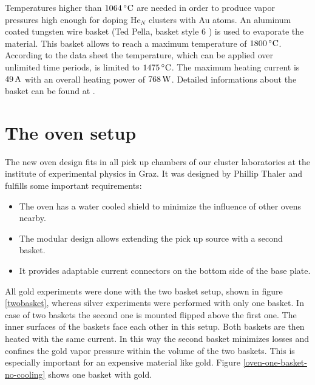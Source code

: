 \documentclass[parskip,12pt,headsepline,a4paper] {scrbook}
\begin{document}
Temperatures higher than $\unit[1064]{^\circ C}$ are needed in order to produce vapor pressures high enough for doping He$_N$ clusters with Au atoms. An aluminum coated tungsten wire basket (Ted Pella, basket style 6 \cite{albasket}) is used to evaporate the material. This basket allows to reach a maximum temperature of $\unit[1800]{^\circ C}$. According to the data sheet the temperature, which can be applied over unlimited time periods, is limited to $\unit[1475]{^\circ C}$. The maximum heating current is $\unit[49]{A}$ with an overall heating power of $\unit[768]{W}$. Detailed informations about the basket can be found at \cite{albasket}. \\

\section{The oven setup}
\vspace{-0.5\baselineskip}
The new oven design fits in all pick up chambers of our cluster laboratories at the institute of experimental physics in Graz. It was designed by Phillip Thaler and fulfills some important requirements:
\begin{itemize}
\item The oven has a water cooled shield to minimize the influence of other ovens nearby.
\item The modular design allows extending the pick up source with a second basket.
\item It provides adaptable current connectors on the bottom side of the base plate.
\end{itemize}

All gold experiments were done with the two basket setup, shown in figure \ref{twobasket}, whereas silver experiments were performed with only one basket. In case of two baskets the second one is mounted flipped above the first one. The inner surfaces of the baskets face each other in this setup. Both baskets are then heated with the same current. In this way the second basket minimizes losses and confines the gold vapor pressure within the volume of the two baskets. This is especially important for an expensive material like gold. Figure \ref{oven-one-basket-no-cooling} shows one basket with gold.
\end{document}
